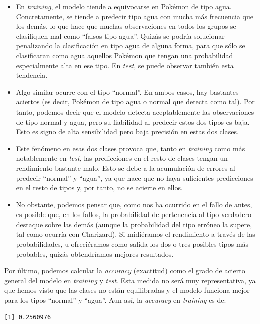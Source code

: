 \documentclass[
  12pt,
]{extreport}
\begin{document}
\begin{itemize}
\item
  En \emph{training}, el modelo tiende a equivocarse en Pokémon de tipo
  agua. Concretamente, se tiende a predecir tipo agua con mucha más
  frecuencia que los demás, lo que hace que muchas observaciones en
  todos los grupos se clasifiquen mal como ``falsos tipo agua''. Quizás
  se podría solucionar penalizando la clasificación en tipo agua de
  alguna forma, para que sólo se clasificaran como agua aquellos Pokémon
  que tengan una probabilidad especialmente alta en ese tipo. En
  \emph{test}, se puede observar también esta tendencia.
\item
  Algo similar ocurre con el tipo ``normal''. En ambos casos, hay
  bastantes aciertos (es decir, Pokémon de tipo agua o normal que
  detecta como tal). Por tanto, podemos decir que el modelo detecta
  aceptablemente las observaciones de tipo normal y agua, pero su
  fiabilidad al predecir estos dos tipos es baja. Esto es signo de alta
  sensibilidad pero baja precisión en estas dos clases.
\item
  Este fenómeno en esas dos clases provoca que, tanto en \emph{training}
  como más notablemente en \emph{test}, las predicciones en el resto de
  clases tengan un rendimiento bastante malo. Esto se debe a la
  acumulación de errores al predecir ``normal'' y ``agua'', ya que hace
  que no haya suficientes predicciones en el resto de tipos y, por
  tanto, no se acierte en ellos.
\item
  No obstante, podemos pensar que, como nos ha ocurrido en el fallo de
  antes, es posible que, en los fallos, la probabilidad de pertenencia
  al tipo verdadero destaque sobre las demás (aunque la probabilidad del
  tipo erróneo la supere, tal como ocurría con Charizard). Si midiéramos
  el rendimiento a través de las probabilidades, u ofreciéramos como
  salida los dos o tres posibles tipos más probables, quizás
  obtendríamos mejores resultados.
\end{itemize}

Por último, podemos calcular la \emph{accuracy} (exactitud) como el
grado de acierto general del modelo en \emph{training} y \emph{test}.
Esta medida no será muy representativa, ya que hemos visto que las
clases no están equilibradas y el modelo funciona mejor para los tipos
``normal'' y ``agua''. Aun así, la \emph{accuracy} en \emph{training} es
de:

\begin{verbatim}
[1] 0.2560976
\end{verbatim}
\end{document}

